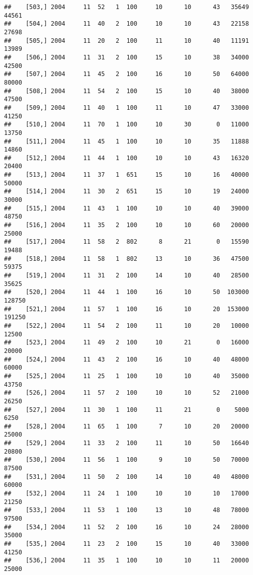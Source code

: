 \documentclass{article}\usepackage[]{graphicx}\usepackage[]{color}
\makeatletter
\newenvironment{kframe}{%
 \def\at@end@of@kframe{}%
 \ifinner\ifhmode%
  \def\at@end@of@kframe{\end{minipage}}%
  \begin{minipage}{\columnwidth}%
 \fi\fi%
 \def\FrameCommand##1{\hskip\@totalleftmargin \hskip-\fboxsep
 \colorbox{shadecolor}{##1}\hskip-\fboxsep
     \hskip-\linewidth \hskip-\@totalleftmargin \hskip\columnwidth}%
 \MakeFramed {\advance\hsize-\width
   \@totalleftmargin\z@ \linewidth\hsize
   \@setminipage}}%
 {\par\unskip\endMakeFramed%
 \at@end@of@kframe}
\newenvironment{knitrout}{}{} %
\makeatother
\begin{document}
\begin{knitrout}
\begin{kframe}
\begin{verbatim}
##    [503,] 2004     11  52   1  100     10      10      43   35649   44561
##    [504,] 2004     11  40   2  100     10      10      43   22158   27698
##    [505,] 2004     11  20   2  100     11      10      40   11191   13989
##    [506,] 2004     11  31   2  100     15      10      38   34000   42500
##    [507,] 2004     11  45   2  100     16      10      50   64000   80000
##    [508,] 2004     11  54   2  100     15      10      40   38000   47500
##    [509,] 2004     11  40   1  100     11      10      47   33000   41250
##    [510,] 2004     11  70   1  100     10      30       0   11000   13750
##    [511,] 2004     11  45   1  100     10      10      35   11888   14860
##    [512,] 2004     11  44   1  100     10      10      43   16320   20400
##    [513,] 2004     11  37   1  651     15      10      16   40000   50000
##    [514,] 2004     11  30   2  651     15      10      19   24000   30000
##    [515,] 2004     11  43   1  100     10      10      40   39000   48750
##    [516,] 2004     11  35   2  100     10      10      60   20000   25000
##    [517,] 2004     11  58   2  802      8      21       0   15590   19488
##    [518,] 2004     11  58   1  802     13      10      36   47500   59375
##    [519,] 2004     11  31   2  100     14      10      40   28500   35625
##    [520,] 2004     11  44   1  100     16      10      50  103000  128750
##    [521,] 2004     11  57   1  100     16      10      20  153000  191250
##    [522,] 2004     11  54   2  100     11      10      20   10000   12500
##    [523,] 2004     11  49   2  100     10      21       0   16000   20000
##    [524,] 2004     11  43   2  100     16      10      40   48000   60000
##    [525,] 2004     11  25   1  100     10      10      40   35000   43750
##    [526,] 2004     11  57   2  100     10      10      52   21000   26250
##    [527,] 2004     11  30   1  100     11      21       0    5000    6250
##    [528,] 2004     11  65   1  100      7      10      20   20000   25000
##    [529,] 2004     11  33   2  100     11      10      50   16640   20800
##    [530,] 2004     11  56   1  100      9      10      50   70000   87500
##    [531,] 2004     11  50   2  100     14      10      40   48000   60000
##    [532,] 2004     11  24   1  100     10      10      10   17000   21250
##    [533,] 2004     11  53   1  100     13      10      48   78000   97500
##    [534,] 2004     11  52   2  100     16      10      24   28000   35000
##    [535,] 2004     11  23   2  100     15      10      40   33000   41250
##    [536,] 2004     11  35   1  100     10      10      11   20000   25000

\end{verbatim}
\end{kframe}
\end{knitrout}
\end{document}
